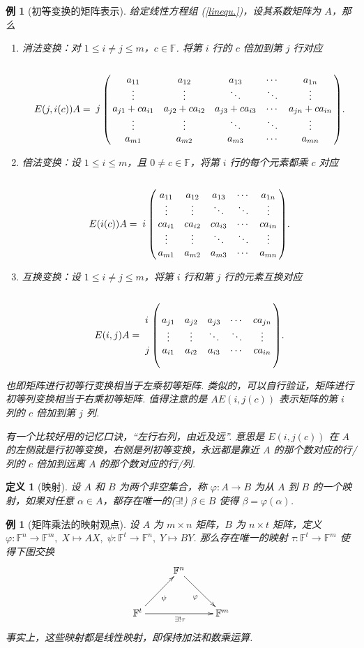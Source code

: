 \documentclass[10pt,openany]{article}
\theoremstyle{thmstyle} %
\theoremstyle{defstyle} %
\newtheorem{definition}[theorem]{定义}
\theoremstyle{prostyle} %
\newtheorem{example}[theorem]{例}
\begin{document}
\begin{example}[初等变换的矩阵表示]
	给定线性方程组 (\ref{linequ.})，设其系数矩阵为 \( A \)，那么
	\begin{enumerate}[(1)]
		\item 消法变换：对 \( 1 \leq i \neq j \leq m \)，\( c \in \mathbb{F} \). 将第 \( i \) 行的 \( c \) 倍加到第 \( j \) 行对应
		\[ E(j,i(c))A=\bordermatrix{
			&&&&& \cr
			&a_{11} & a_{12} & a_{13} & \cdots & a_{1n} \cr
			&\vdots & \vdots & \ddots & \ddots & \vdots \cr
			j &a_{j1}+ca_{i1} & a_{j2}+ca_{i2} & a_{j3}+ca_{i3} &  \cdots & a_{jn}+ca_{in} \cr
			&\vdots & \vdots & \ddots & \ddots & \vdots \cr
			&a_{m1} & a_{m2} & a_{m3} & \cdots & a_{mn}
		}. \]
		\item 倍法变换：设 \( 1 \leq i \leq m \)，且 \( 0 \neq c \in \mathbb{F} \)，将第 \( i \) 行的每个元素都乘 \( c \) 对应
		\[ E(i(c))A=\bordermatrix{
			&&&&& \cr
			&a_{11} & a_{12} & a_{13} & \cdots & a_{1n} \cr
			&\vdots & \vdots & \ddots & \ddots & \vdots \cr
			i &ca_{i1} & ca_{i2} & ca_{i3} &  \cdots & ca_{in} \cr
			&\vdots & \vdots & \ddots & \ddots & \vdots \cr
			&a_{m1} & a_{m2} & a_{m3} & \cdots & a_{mn}
		}.  \]
		\item 互换变换：设 \( 1 \leq i \neq j \leq m \)，将第 \( i \) 行和第 \( j \) 行的元素互换对应
		\[ E(i,j)A=\bordermatrix{
			&&&&& \cr
			&&&&& \cr
			i &a_{j1} & a_{j2} & a_{j3} &  \cdots & ca_{jn} \cr
			&\vdots & \vdots & \ddots & \ddots & \vdots \cr
			j &a_{i1} & a_{i2} & a_{i3} &  \cdots & ca_{in} \cr
			&&&&& 
		}.   \]
	\end{enumerate}
	
	也即矩阵进行初等行变换相当于左乘初等矩阵. 类似的，可以自行验证，矩阵进行初等列变换相当于右乘初等矩阵. 值得注意的是 \( AE(i,j(c)) \) 表示矩阵的第 \( i \) 列的 \( c \) 倍加到第 \( j \) 列. 
	
	有一个比较好用的记忆口诀，“左行右列，由近及远”. 意思是 \( E(i,j(c)) \) 在 \( A \) 的左侧就是行初等变换，右侧是列初等变换，永远都是靠近 \( A \) 的那个数对应的行/列的 \( c \) 倍加到远离 \( A \) 的那个数对应的行/列.
\end{example}

\begin{definition}[映射]
	设 \( A \) 和 \( B \) 为两个非空集合，称 \( \varphi:A \to B \) 为从 \( A \) 到 \( B \) 的一个映射，如果对任意 \( \alpha \in A \)，都存在唯一的(\( \exists !\)) \( \beta \in B \) 使得 \( \beta=\varphi(\alpha) \). 
\end{definition}


\begin{example}[矩阵乘法的映射观点]
	设 \( A \) 为 \( m \times n \) 矩阵，\( B \) 为 \( n \times t \) 矩阵，定义 \( \varphi: \mathbb{F}^n \to \mathbb{F}^m, \; X \mapsto AX, \; \psi: \mathbb{F}^t \to \mathbb{F}^n, \; Y \mapsto BY \). 那么存在唯一的映射 \( \tau: \mathbb{F}^t \to \mathbb{F}^m \) 使得下图交换
	\[ \xymatrix@R=7ex@C=6ex{
		 & \mathbb{F}^n\ar"2,3"_{\varphi} & \\
		\mathbb{F}^t\ar"1,2"_{\psi}\ar"2,3"_{\exists ! \tau} &  & \mathbb{F}^m\\
	} \]
	事实上，这些映射都是线性映射，即保持加法和数乘运算.
	\label{1.3.6}
\end{example}
\end{document}
